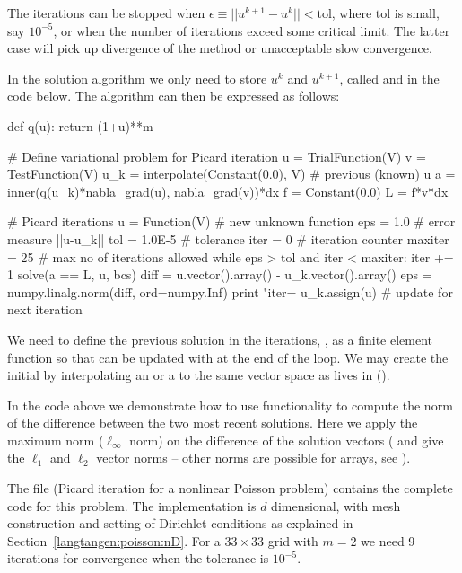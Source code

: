 The iterations can be stopped when $\epsilon\equiv ||u^{k+1}-u^k||
< \mathrm{tol}$, where $\mathrm{tol}$ is small, say $10^{-5}$, or
when the number of iterations exceed some critical limit. The latter
case will pick up divergence of the method or unacceptable slow
convergence.

\clearpage

In the solution algorithm we only need to store $u^k$ and $u^{k+1}$,
called  and  in the code below.
The algorithm can then be expressed as follows:
\begin{python}
def q(u):
    return (1+u)**m

# Define variational problem for Picard iteration
u = TrialFunction(V)
v = TestFunction(V)
u_k = interpolate(Constant(0.0), V)  # previous (known) u
a = inner(q(u_k)*nabla_grad(u), nabla_grad(v))*dx
f = Constant(0.0)
L = f*v*dx

# Picard iterations
u = Function(V)     # new unknown function
eps = 1.0           # error measure ||u-u_k||
tol = 1.0E-5        # tolerance
iter = 0            # iteration counter
maxiter = 25        # max no of iterations allowed
while eps > tol and iter < maxiter:
    iter += 1
    solve(a == L, u, bcs)
    diff = u.vector().array() - u_k.vector().array()
    eps = numpy.linalg.norm(diff, ord=numpy.Inf)
    print "iter=%
    u_k.assign(u)   # update for next iteration
\end{python}
We need to define the previous solution in the iterations,
, as a finite element function so
that  can be updated with
 at the end of the loop. We may
create the initial 
 by interpolating an
 or a
 to the same vector space as
 lives in
().

In the code above we demonstrate how to use
 functionality to compute the
norm of the difference between the two most recent solutions. Here we
apply the maximum norm ($\ell_\infty$ norm) on the difference of the
solution vectors ( and
 give the $\ell_1$ and $\ell_2$
vector norms -- other norms are possible for
 arrays, see
).

The file  (Picard iteration for a nonlinear Poisson
problem) contains
the complete code for this problem. The implementation is $d$
dimensional, with mesh construction and setting of Dirichlet
conditions as explained in Section~\ref{langtangen:poisson:nD}.  For a
$33\times 33$ grid with $m=2$ we need 9 iterations for convergence
when the tolerance is $10^{-5}$.

